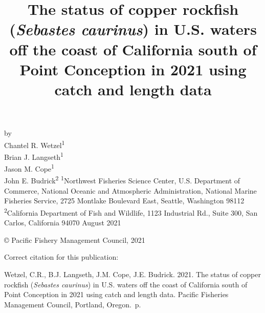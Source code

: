 \documentclass[11pt,
  english,
  a4paper,
]{article}
\date{}
\newcommand{\trTitle}{The status of copper rockfish (\emph{Sebastes caurinus}) in U.S. waters off the coast of California south of Point Conception in 2021 using catch and length data}
\newcommand{\trYear}{2021}
\newcommand{\trMonth}{August}
\newcommand{\trAuthsBack}{Wetzel, C.R., B.J. Langseth, J.M. Cope, J.E. Budrick}
\newcommand{\trCitation}{
\begin{hangparas}{1em}{1}
\trAuthsBack{}. \trYear{}. \trTitle{}. Pacific Fisheries Management Council, Portland, Oregon. \pageref{LastPage}{}\,p.
\end{hangparas}}
\begin{document}

\renewcommand*{\thefootnote}{\fnsymbol{footnote}}

\small
\thispagestyle{empty}
\noindent
\begin{center}
\title{The status of copper rockfish (\emph{Sebastes caurinus}) in U.S. waters off the coast of California south of Point Conception in 2021 using catch and length data}
\vspace{1.5cm}
{\Large\textbf{}}
\vfill
by\\
Chantel R. Wetzel\textsuperscript{1}\\
Brian J. Langseth\textsuperscript{1}\\
Jason M. Cope\textsuperscript{1}\\
John E. Budrick\textsuperscript{2}\vfill
\textsuperscript{1}Northwest Fisheries Science Center, U.S. Department of Commerce, National Oceanic and Atmospheric Administration, National Marine Fisheries Service, 2725 Montlake Boulevard East, Seattle, Washington 98112\\
\textsuperscript{2}California Department of Fish and Wildlife, 1123 Industrial Rd., Suite 300, San Carlos, California 94070\vfill
\trMonth{} \trYear{}
\end{center}
\clearpage

\thispagestyle{empty}
\vspace*{\fill}
\begin{center}
\copyright{} Pacific Fishery Management Council, \trYear{}\\
\end{center}
\par
\bigskip
\noindent
Correct citation for this publication:
\bigskip
\par
\trCitation{}
\clearpage


\tableofcontents\clearpage
\label{TRlastRoman}
\clearpage

\newpage
\thispagestyle{empty} %
\end{document}
